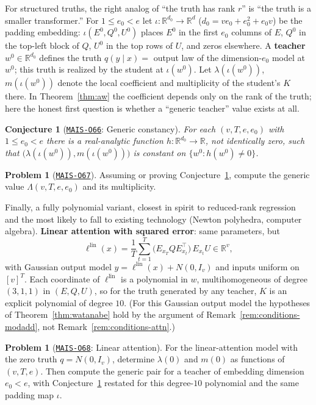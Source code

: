 \documentclass[11pt]{amsart}
\newcommand{\Oid}[1]{\href{https://github.com/lionellevine/MAIS/blob/main/open-problems/MAIS-O#1.md}{\texttt{MAIS-O#1}}}
\theoremstyle{plain}
\newtheorem{conjecture}[theorem]{Conjecture}
\theoremstyle{definition}
\newtheorem{problem}[theorem]{Problem}
\newcommand{\R}{\mathbb{R}}
\begin{document}
For structured truths, the right analog of ``the truth has rank $r$'' is ``the truth is a smaller transformer.'' For $1 \le e_0 < e$ let $\iota \colon \R^{d_0} \to \R^d$ ($d_0 = ve_0 + e_0^2 + e_0 v$) be the padding embedding: $\iota(E^0, Q^0, U^0)$ places $E^0$ in the first $e_0$ columns of $E$, $Q^0$ in the top-left block of $Q$, $U^0$ in the top rows of $U$, and zeros elsewhere. A \textbf{teacher} $w^0 \in \R^{d_0}$ defines the truth $q(y \mid x) = $ output law of the dimension-$e_0$ model at $w^0$; this truth is realized by the student at $\iota(w^0)$. Let $\lambda(\iota(w^0))$, $m(\iota(w^0))$ denote the local coefficient and multiplicity of the student's $K$ there. In Theorem~\ref{thm:aw} the coefficient depends only on the rank of the truth; here the honest first question is whether a ``generic teacher'' value exists at all.

\begin{conjecture}[\Oid{66}: Generic constancy]\label{conj:generic}
For each $(v, T, e, e_0)$ with $1 \le e_0 < e$ there is a real-analytic function $h \colon \R^{d_0} \to \R$, not identically zero, such that $\bigl(\lambda(\iota(w^0)), m(\iota(w^0))\bigr)$ is constant on $\{w^0 : h(w^0) \neq 0\}$.
\end{conjecture}

\begin{problem}[\Oid{67}]\label{prob:attn-teacher}
Assuming or proving Conjecture~\ref{conj:generic}, compute the generic value $\Lambda(v, T, e, e_0)$ and its multiplicity.
\end{problem}

Finally, a fully polynomial variant, closest in spirit to reduced-rank regression and the most likely to fall to existing technology (Newton polyhedra, computer algebra). \textbf{Linear attention with squared error}: same parameters, but
\[
   \ell^{\mathrm{lin}}(x) = \frac1T \sum_{t=1}^{T} \bigl(E_{x_T} Q E_{x_t}^{\!\top}\bigr)\, E_{x_t} U \in \R^v,
\]
with Gaussian output model $y = \ell^{\mathrm{lin}}(x) + N(0, I_v)$ and inputs uniform on $[v]^T$. Each coordinate of $\ell^{\mathrm{lin}}$ is a polynomial in $w$, multihomogeneous of degree $(3,1,1)$ in $(E, Q, U)$, so for the truth generated by any teacher, $K$ is an explicit polynomial of degree $10$. (For this Gaussian output model the hypotheses of Theorem~\ref{thm:watanabe} hold by the argument of Remark~\ref{rem:conditions-modadd}, not Remark~\ref{rem:conditions-attn}.)

\begin{problem}[\Oid{68}: Linear attention]\label{prob:linear-attn}
For the linear-attention model with the zero truth $q=N(0,I_v)$, determine $\lambda(0)$ and $m(0)$ as functions of $(v,T,e)$. Then compute the generic pair for a teacher of embedding dimension $e_0<e$, with Conjecture~\textup{\ref{conj:generic}} restated for this degree-$10$ polynomial and the same padding map $\iota$.
\end{problem}
\end{document}

